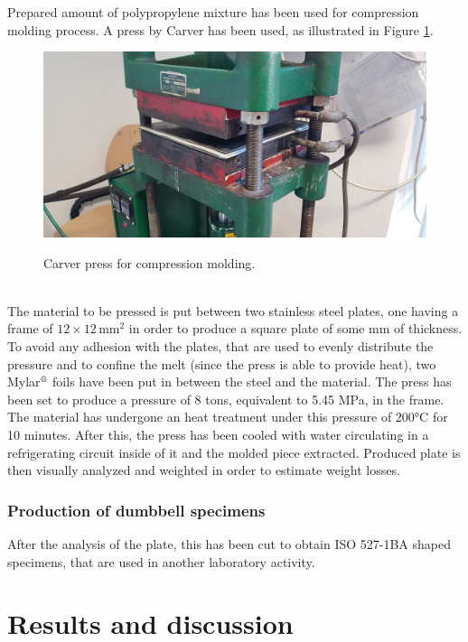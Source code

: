 \documentclass[a4paper, 11pt]{article}
\begin{document}
Prepared amount of polypropylene mixture has been used for compression molding process. A press by Carver has been used, as illustrated in Figure \ref{fig:press}. 
\begin{figure}[htp]
	\centering
	\includegraphics[scale=0.2]
	{PHOTO-2019-05-23-17-38-03.jpg}
	\label{fig:press}
	\caption{Carver press for compression molding.}
\end{figure}\\
The material to be pressed is put between two stainless steel plates, one having a frame of $12\times 12\, \text{mm}^2$ in order to produce a square plate of some mm of thickness. To avoid any adhesion with the plates, that are used to evenly distribute the pressure and to confine the melt (since the press is able to provide heat), two Mylar${^\text{\textregistered}}$ foils have been put in between the steel and the material. The press has been set to produce a pressure of 8 tons, equivalent to 5.45 MPa, in the frame. The material has undergone an heat treatment under this pressure of 200°C for 10 minutes. After this, the press has been cooled with water circulating in a refrigerating circuit inside of it and the molded piece extracted. Produced plate is then visually analyzed and weighted in order to estimate weight losses. \par 

\subsubsection{Production of dumbbell specimens}

After the analysis of the plate, this has been cut to obtain ISO 527-1BA shaped specimens, that are used in another laboratory activity.     

\section{Results and discussion}
\end{document}
